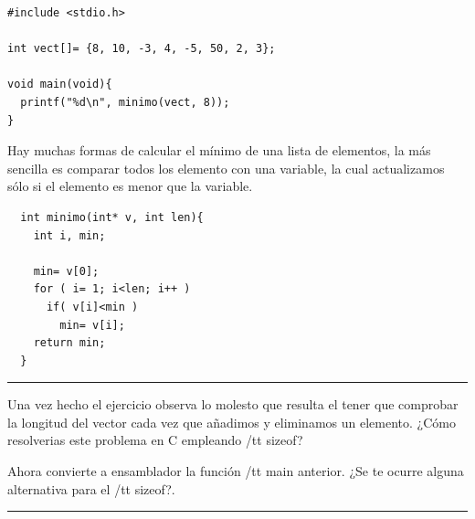 \begin{lstlisting}
#include <stdio.h>

int vect[]= {8, 10, -3, 4, -5, 50, 2, 3};

void main(void){
  printf("%d\n", minimo(vect, 8));
}
\end{lstlisting}

Hay muchas formas de calcular el mínimo de una lista de elementos, la más sencilla es
comparar todos los elemento con una variable, la cual actualizamos sólo si el elemento es
menor que la variable.

\begin{center}
\begin{myfbox}
\small
\begin{minipage}{0.92\linewidth}
\begin{center}
\begin{minipage}{0.6\linewidth}
\begin{verbatim}
  int minimo(int* v, int len){
    int i, min;

    min= v[0];
    for ( i= 1; i<len; i++ )
      if( v[i]<min )
        min= v[i];
    return min;
  }
\end{verbatim}
\end{minipage}
\end{center}
\begin{center}
\colorbox[gray]{1}{\rule{0cm}{7cm}\rule{11cm}{0cm}}
\end{center}
\end{minipage}
\end{myfbox}
\end{center}

Una vez hecho el ejercicio observa lo molesto que resulta el tener que
comprobar la longitud del vector cada vez que añadimos y eliminamos un
elemento. ¿Cómo resolverias este problema en C empleando {/tt sizeof}?

Ahora convierte a ensamblador la función {/tt main} anterior. ¿Se te
ocurre alguna alternativa para el {/tt sizeof}?.

\begin{center}
\begin{myfbox}
\small
\begin{minipage}{0.92\linewidth}
\begin{center}
\colorbox[gray]{1}{\rule{0cm}{4.5cm}\rule{11cm}{0cm}}
\end{center}
\end{minipage}
\end{myfbox}
\end{center}

